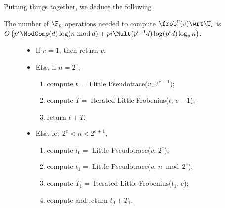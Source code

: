 Putting things together, we deduce the following
\sloppy
\begin{corollary}
  The number of $\F_p$ operations needed to compute
  $\frob^n(v)\wrt\U_i$ is $O\left(p^i\ModComp(d)\log(n\bmod d) +
  pi\Mult(p^{i+1}d)\log(p^id)\log_pn\right)$.
\end{corollary}
\fussy




\begin{figure}[h]
  \begin{itemize}
  \item \label{alg:l-pseudo:base}If $n = 1$, then return $v$.
  \item \label{alg:l-pseudo:even}Else, if $n=2^e$, 
    \begin{enumerate}
    \item \label{alg:l-pseudo:rec}compute $t = $ Little Pseudotrace($v$,
      $2^{e-1}$);
    \item \label{alg:l-pseudo:frob} compute $T = $ Iterated Little
      Frobenius($t$, $e-1$);
    \item \label{alg:l-pseudo:sum}return $t + T$.
    \end{enumerate}
  \item \label{alg:l-pseudo:odd}Else, let $2^e<n< 2^{e+1}$,
    \begin{enumerate}
    \item compute $t_0 = $ Little Pseudotrace($v$, $2^e$);
    \item compute $t_1 = $ Little Pseudotrace($v$, $n \bmod 2^e$);
    \item \label{alg:l-pseudo:frob2}compute $T_1 = $ Iterated Little
      Frobenius($t_1$, $e$);
    \item compute and return $t_0 + T_1$.
    \end{enumerate}
  \end{itemize}
\end{figure}

